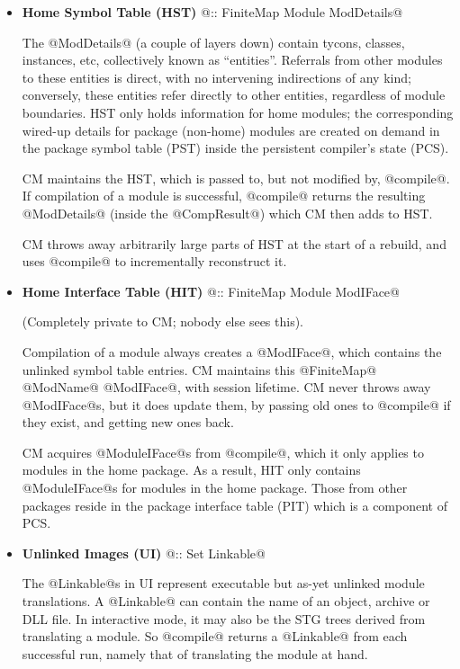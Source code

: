 \documentclass[11pt]{article}
\begin{document}
\begin{itemize}
\item
   {\bf Home Symbol Table (HST)} @:: FiniteMap Module ModDetails@

   The @ModDetails@ (a couple of layers down) contain tycons, classes,
   instances, etc, collectively known as ``entities''.  Referrals from
   other modules to these entities is direct, with no intervening
   indirections of any kind; conversely, these entities refer directly
   to other entities, regardless of module boundaries.  HST only holds
   information for home modules; the corresponding wired-up details
   for package (non-home) modules are created on demand in the package
   symbol table (PST) inside the persistent compiler's state (PCS).

   CM maintains the HST, which is passed to, but not modified by,
   @compile@.  If compilation of a module is successful, @compile@
   returns the resulting @ModDetails@ (inside the @CompResult@) which
   CM then adds to HST.

   CM throws away arbitrarily large parts of HST at the start of a
   rebuild, and uses @compile@ to incrementally reconstruct it.

\item
   {\bf Home Interface Table (HIT)} @:: FiniteMap Module ModIFace@

   (Completely private to CM; nobody else sees this).

   Compilation of a module always creates a @ModIFace@, which contains
   the unlinked symbol table entries.  CM maintains this @FiniteMap@
   @ModName@ @ModIFace@, with session lifetime.  CM never throws away
   @ModIFace@s, but it does update them, by passing old ones to
   @compile@ if they exist, and getting new ones back.

   CM acquires @ModuleIFace@s from @compile@, which it only applies
   to modules in the home package.  As a result, HIT only contains
   @ModuleIFace@s for modules in the home package.  Those from other
   packages reside in the package interface table (PIT) which is a
   component of PCS.

\item
   {\bf Unlinked Images (UI)} @:: Set Linkable@

   The @Linkable@s in UI represent executable but as-yet unlinked
   module translations.  A @Linkable@ can contain the name of an
   object, archive or DLL file.  In interactive mode, it may also be
   the STG trees derived from translating a module.  So @compile@
   returns a @Linkable@ from each successful run, namely that of
   translating the module at hand.  


\end{itemize}
\end{document}
